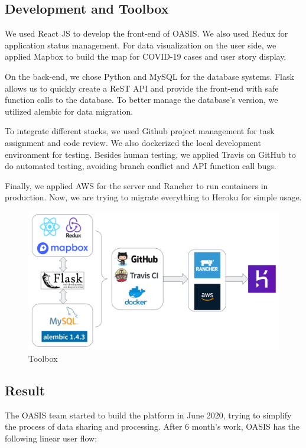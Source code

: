 \documentclass{ucsdreport}
\begin{document}
\subsection{Development and Toolbox}
We used React JS to develop the front-end of OASIS. We also used Redux for 
application status management. For data visualization on the user side, we 
applied Mapbox to build the map for COVID-19 cases and user story display. 

On the back-end, we chose Python and MySQL for the database systems. Flask 
allows us to quickly create a ReST API and provide the front-end with safe 
function calls to the database. To better manage the database’s version, we 
utilized alembic for data migration. 

To integrate different stacks, we used Github project management for task
assignment and code review. We also dockerized the local development environment
for testing. Besides human testing, we applied Travis on GitHub to do automated
testing, avoiding branch conflict and API function call bugs. 

Finally, we applied AWS for the server and Rancher to run containers in 
production. Now, we are trying to migrate everything to Heroku for simple usage. 

\begin{figure}[H]
    \centering
    \includegraphics[scale=0.4]{images/tools.PNG}
    \caption{Toolbox}
\end{figure}

\subsection{Result}
The OASIS team started to build the platform in June 2020, trying to simplify
the process of data sharing and processing. After 6 month’s work, OASIS has the 
following linear user flow:
\end{document}
